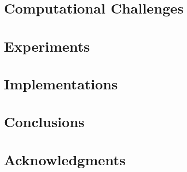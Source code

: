 \documentclass[leqno,onefignum,onetabnum,twocolumn]{siamltex1213}
\begin{document}
\section{Computational Challenges}


\section{Experiments}

\section{Implementations}

\section{Conclusions} \label{sec:conclusions}

\section{Acknowledgments} \label{sec:acknowledgments}


 



\end{document}
